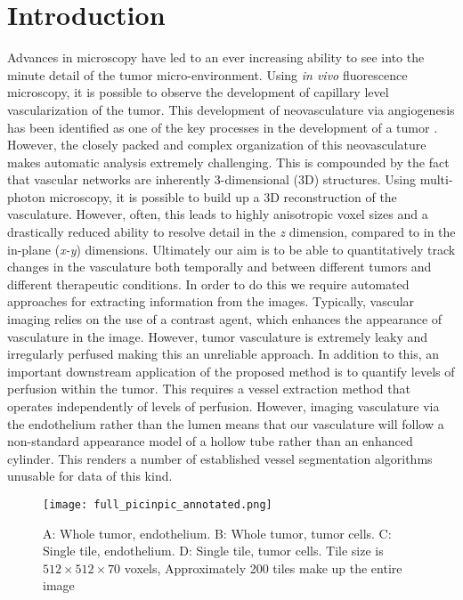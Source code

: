 \documentclass[journal,transmag]{IEEEtran}
\begin{document}
\section{Introduction}
Advances in microscopy have led to an ever increasing ability to see into the minute detail of the tumor micro-environment. Using \textit{in vivo} fluorescence microscopy, it is possible to observe the development of capillary level vascularization of the tumor. This development of neovasculature via angiogenesis has been identified as one of the key processes in the development of a tumor \cite{Hanahan2011}. However, the closely packed and complex organization of this neovasculature makes automatic analysis extremely challenging. This is compounded by the fact that vascular networks are inherently 3-dimensional (3D) structures. Using multi-photon microscopy, it is possible to build up a 3D reconstruction of the vasculature. However, often, this leads to highly anisotropic voxel sizes and a drastically reduced ability to resolve detail in the \textit{z} dimension, compared to in the in-plane (\textit{x-y}) dimensions. Ultimately our aim is to be able to quantitatively track changes in the vasculature both temporally and between different tumors and different therapeutic conditions. In order to do this we require automated approaches for extracting information from the images. Typically, vascular imaging relies on the use of a contrast agent, which enhances the appearance of vasculature in the image. However, tumor vasculature is extremely leaky and irregularly perfused making this an unreliable approach. In addition to this, an important downstream application of the proposed method is to quantify levels of perfusion within the tumor. This requires a vessel extraction method that operates independently of levels of perfusion. However, imaging vasculature via the endothelium rather than the lumen means that our vasculature will follow a non-standard appearance model of a hollow tube rather than an enhanced cylinder. This renders a number of established vessel segmentation algorithms unusable for data of this kind. 

\begin{figure}[t]
\centering
\texttt{[image: full\_picinpic\_annotated.png]}
\caption{A: Whole tumor, endothelium. B: Whole tumor, tumor cells. C: Single tile, endothelium. D: Single tile, tumor cells. Tile size is $512 \times 512 \times 70$ voxels, Approximately 200 tiles make up the entire image}
\end{figure}
\end{document}
